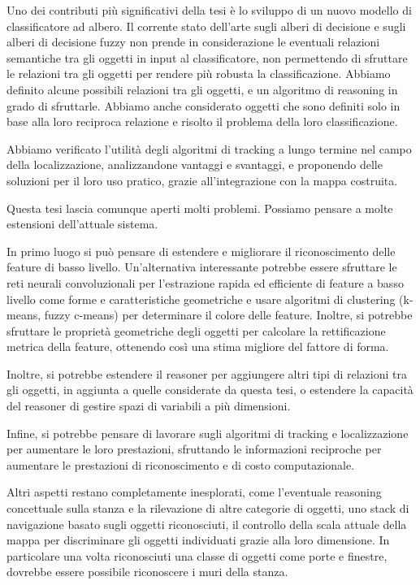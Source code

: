 Uno dei contributi più significativi della tesi è lo sviluppo di un nuovo modello di classificatore ad albero. Il corrente stato dell'arte sugli alberi di decisione e sugli alberi di decisione fuzzy non prende in considerazione le eventuali relazioni semantiche tra gli oggetti in input al classificatore, non permettendo di sfruttare le relazioni tra gli oggetti per rendere più robusta la classificazione.
Abbiamo definito alcune possibili relazioni tra gli oggetti, e un algoritmo di reasoning in grado di sfruttarle. Abbiamo anche considerato oggetti che sono definiti solo in base alla loro reciproca relazione e risolto il problema della loro classificazione.

Abbiamo verificato l'utilità degli algoritmi di tracking a lungo termine nel campo della localizzazione, analizzandone vantaggi e svantaggi, e proponendo delle soluzioni per il loro uso pratico, grazie all'integrazione con la mappa costruita.

Questa tesi lascia comunque aperti molti problemi. Possiamo pensare a molte estensioni dell'attuale sistema.

In primo luogo si può pensare di estendere e migliorare il riconoscimento delle feature di basso livello. Un'alternativa interessante potrebbe essere sfruttare le reti neurali convoluzionali per l'estrazione rapida ed efficiente di feature a basso livello come forme e caratteristiche geometriche e usare algoritmi di clustering (k-means, fuzzy c-means) per determinare il colore delle feature. Inoltre, si potrebbe sfruttare le proprietà geometriche degli oggetti per calcolare la rettificazione metrica della feature, ottenendo così una stima migliore del fattore di forma.

Inoltre, si potrebbe estendere il reasoner per aggiungere altri tipi di relazioni tra gli oggetti, in aggiunta a quelle considerate da questa tesi, o estendere la capacità del reasoner di gestire spazi di variabili a più dimensioni.

Infine, si potrebbe pensare di lavorare sugli algoritmi di tracking e localizzazione per aumentare le loro prestazioni, sfruttando le informazioni reciproche per aumentare le prestazioni di riconoscimento e di costo computazionale.

Altri aspetti restano completamente inesplorati, come l'eventuale reasoning concettuale sulla stanza e la rilevazione di altre categorie di oggetti, uno stack di navigazione basato sugli oggetti riconosciuti, il controllo della scala attuale della mappa per discriminare gli oggetti individuati grazie alla loro dimensione. In particolare una volta riconosciuti una classe di oggetti come porte e finestre, dovrebbe essere possibile riconoscere i muri della stanza.
